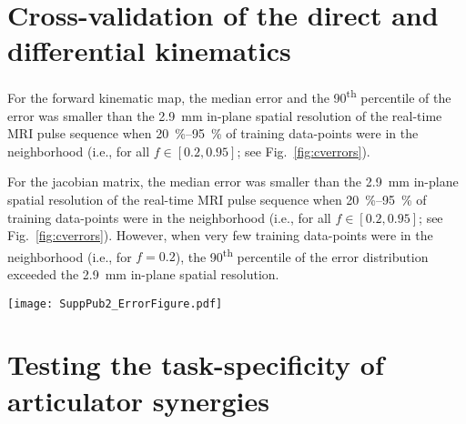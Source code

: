 \documentclass[reprint]{JASAnew}\usepackage[]{graphicx}\usepackage[]{color}
\begin{document}
\section{Cross-validation of the direct and differential kinematics}
\label{sec:crossvalidation}

For the forward kinematic map, the median error and the 90\textsuperscript{th} percentile of the error was smaller than the \SI{2.9}{\milli\meter} in-plane spatial resolution of the real-time MRI pulse sequence when \SIrange{20}{95}{\percent} of training data-points were in the neighborhood (i.e., for all $f\in \left[ 0.2, 0.95\right]$; see Fig.~\ref{fig:cverrors}). 

For the jacobian matrix, the median error was smaller than the \SI{2.9}{\milli\meter} in-plane spatial resolution of the real-time MRI pulse sequence when \SIrange{20}{95}{\percent} of training data-points were in the neighborhood (i.e., for all $f\in \left[ 0.2, 0.95\right]$; see Fig.~\ref{fig:cverrors}). However, when very few training data-points were in the neighborhood (i.e., for $f=0.2$), the 90\textsuperscript{th} percentile of the error distribution exceeded the \SI{2.9}{\milli\meter} in-plane spatial resolution. 

\begin{figure*}
\raggedright
\texttt{[image: SuppPub2\_ErrorFigure.pdf]}
\caption{
{\bf (a)} Median error (line) and 10\textsuperscript{th}-90\textsuperscript{th} percentile error range (shaded) of the forward kinematic map estimator of constriction task variables. {\bf (b)} Median error (line) and 10\textsuperscript{th}-90\textsuperscript{th} percentile error range (shaded) of the jacobian matrix estimator of frame-to-frame finite differences in constriction task variables. 
Data-points are the errors computed over all 10 folds of cross-validation.
Neighborhood size is given as percentage of training data-points.
The standard deviation of observed (frame-to-frame finite differences in) constriction task variables is indicated as a dashed line whenever the standard deviation is small enough to fit within the $y$-axis limits.}
\label{fig:cverrors}
\end{figure*}















\section{Testing the task-specificity of articulator synergies}
\label{sec:taskdependence}
\end{document}
